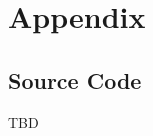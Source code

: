 \documentclass[main.tex]{subfiles}
\begin{document}
	\section{Appendix}
	\subsection{Source Code}
	
	TBD
	
	
\end{document}
